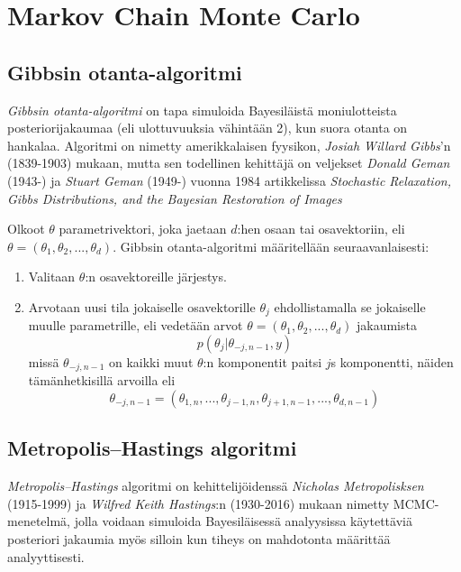 \chapter{Markov Chain Monte Carlo}

\section{Gibbsin otanta-algoritmi}\label{gibbs}

\textit{Gibbsin otanta-algoritmi} on tapa simuloida Bayesiläistä moniulotteista posteriorijakaumaa (eli ulottuvuuksia vähintään 2), kun suora otanta on hankalaa. Algoritmi on nimetty amerikkalaisen fyysikon, \textit{Josiah Willard Gibbs}'n (1839-1903) mukaan, mutta sen todellinen kehittäjä on veljekset \textit{Donald Geman} (1943-) ja \textit{Stuart Geman} (1949-) vuonna 1984 artikkelissa \textit{Stochastic Relaxation, Gibbs Distributions, and the Bayesian Restoration of Images}

\begin{maar}
	Olkoot $\theta$ parametrivektori, joka jaetaan $d$:hen osaan tai osavektoriin, eli $\theta = (\theta_1, \theta_2,...,\theta_d)$. Gibbsin otanta-algoritmi määritellään seuraavanlaisesti:
	\begin{enumerate}
		\item Valitaan $\theta$:n osavektoreille järjestys.
		\item Arvotaan uusi tila jokaiselle osavektorille $\theta_j$ ehdollistamalla se jokaiselle muulle parametrille, eli vedetään arvot $\theta = (\theta_1, \theta_2,...,\theta_d)$ jakaumista
		\begin{equation}
			p(\theta_j|\theta_{-j,n-1},y)
		\end{equation}
		missä $\theta_{-j,n-1}$ on kaikki muut $\theta$:n komponentit paitsi $j$s komponentti, näiden tämänhetkisillä arvoilla eli 
		\begin{equation*}
			\theta_{-j,n-1} = (\theta_{1,n},...,\theta_{j-1,n},\theta_{j+1,n-1},...,\theta_{d,n-1})
		\end{equation*}
	\end{enumerate}
\end{maar}



\section{Metropolis--Hastings algoritmi}\label{Metropolis--Hastings algoritmi}

\textit{Metropolis--Hastings} algoritmi on kehittelijöidenssä \textit{Nicholas Metropolisksen} (1915-1999) ja \textit{Wilfred Keith Hastings}:n (1930-2016) mukaan nimetty MCMC-menetelmä, jolla voidaan simuloida Bayesiläisessä analyysissa käytettäviä posteriori jakaumia myös silloin kun tiheys on mahdotonta määrittää analyyttisesti.

